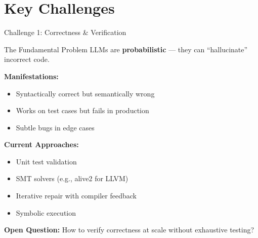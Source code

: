\documentclass[aspectratio=169,10pt]{beamer}
\begin{document}
\section{Key Challenges}

\begin{frame}{Challenge 1: Correctness \& Verification}
    \begin{alertblock}{The Fundamental Problem}
    LLMs are \textbf{probabilistic} — they can ``hallucinate'' incorrect code.
    \end{alertblock}
    
    \textbf{Manifestations:}
    \begin{itemize}
        \item Syntactically correct but semantically wrong
        \item Works on test cases but fails in production
        \item Subtle bugs in edge cases
    \end{itemize}
    
    \textbf{Current Approaches:}
    \begin{itemize}
        \item Unit test validation
        \item SMT solvers (e.g., alive2 for LLVM)
        \item Iterative repair with compiler feedback
        \item Symbolic execution
    \end{itemize}
    
    \textbf{Open Question:} How to verify correctness at scale without exhaustive testing?
\end{frame}
\end{document}
